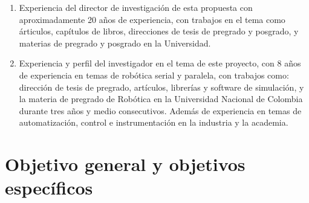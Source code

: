 \begin{itemize}
\begin{enumerate}[1)]
  \item Experiencia del director de investigaci\'on de esta propuesta con aproximadamente 20 a\~nos de experiencia, con trabajos en el tema como \'articulos\cite{Heredia2007}, cap\'itulos de libros\cite{M2005,M2005a}, direcciones de tesis de pregrado y posgrado, y materias de pregrado y posgrado en la Universidad.
  \item Experiencia y perfil del investigador en el tema de este proyecto, con 8 a\~nos de experiencia en temas de rob\'otica serial y paralela, con trabajos como: direcci\'on de tesis de pregrado\cite{Cortes2009,Valencia2009,Barragan2009,Silva2009}, art\'iculos\cite{Castillo2007}, librer\'ias\cite{Castillo2008} y software de simulaci\'on\cite{Castillo2010}, y la materia de pregrado de Rob\'otica en la Universidad Nacional de Colombia durante tres a\~nos y medio consecutivos. Adem\'as de experiencia en temas de automatizaci\'on, control e instrumentaci\'on en la industria y la academia.
  \end{enumerate}
\end{itemize}

\section[Objetivos]{Objetivo general y objetivos espec\'ificos}
\label{sec:objs}

